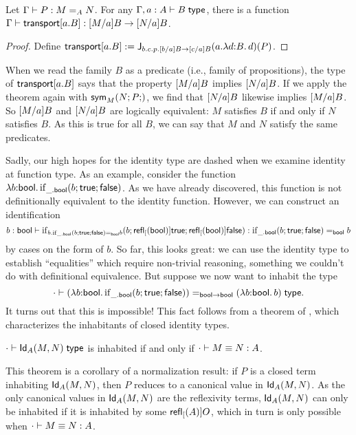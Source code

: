 \documentclass{article}
\newcommand{\Idsym}[4]{\mathsf{sym}_{#1}(#2;#3;#4)}
\begin{document}
\begin{theorem}
  Let $\hasEF{\Gamma}{P}{\Ideq{A}{M}{N}}$. For any $\hasTF{\Gamma,a:A}{B}$,
  there is a function
  $\hasEF{\Gamma}{\transport{a.B}}{\subst{M}{a}{B} \to \subst{N}{a}{B}}$.
\end{theorem}
\begin{proof}
  Define
  $\mathsf{transport}[{a.B}] := \mathsf{J}_{b.c.p.[b/a]B \to [c/a]B}(a.\lambda d {:} B.\, d)(P)$.
\end{proof}

When we read the family $B$ as a predicate (i.e., family of propositions), the
type of $\mathsf{transport}[{a.B}]$ says that the property $[M/a]B$ implies
$[N/a]B$. If we apply the theorem again with $\Idsym{M}{N}{P}$, we find
that $[N/a]B$ likewise implies $[M/a]B$. So $[M/a]B$
and $[N/a]B$ are logically equivalent: $M$ satisfies $B$ if and only if
$N$ satisfies $B$. As this is true for all $B$, we can say that $M$ and $N$
satisfy the same predicates.

Sadly, our high hopes for the identity type are dashed when we examine identity
at function type. As an example, consider the function
$\lambda b {:} \mathsf{bool}.\, \mathrm{if}_{\_.\mathsf{bool}}(b; \mathsf{true}; \mathsf{false})$. As we have already
discovered, this function is not definitionally equivalent to the identity
function. However, we can construct an identification
\[
  \hasEF{b:\bool}{\ifexprtyp{b.\Ideq{\bool}{\ifexprtyp{\_.\bool}{b}{\true}{\false}}{b}}{b}{\refl[\bool]{\true}}{\refl[\bool]{\false}}}{\Ideq{\bool}{\ifexprtyp{\_.\bool}{b}{\true}{\false}}{b}}
\]
by cases on the form of $b$. So far, this looks great: we can use the identity
type to establish ``equalities'' which require non-trivial reasoning, something
we couldn't do with definitional equivalence. But suppose we now want to inhabit
the type
\[
  \hasTF{\cdot}{\Ideq{\bool\to\bool}{(\lam{b}{\bool}{\ifexprtyp{\_.\bool}{b}{\true}{\false}})}{(\lam{b}{\bool}{b})}}.
\]
It turns out that this is impossible! This fact follows from a theorem of
\citet[Theorem 3.14]{MartinLof:73}, which characterizes the inhabitants of
closed identity types.

\begin{theorem}[Martin-L\"of]
  \label{thm:closed-id-is-definitional}
  $\hasTF{\cdot}{\Id{A}{M}{N}}$ is inhabited if and only if
  $\hasEEF{\cdot}{M}{N}{A}$.
\end{theorem}

This theorem is a corollary of a normalization result: if $P$ is a closed term
inhabiting $\mathsf{Id}_{A}(M,N)$, then $P$ reduces to a canonical value in
$\mathsf{Id}_{A}(M,N)$. As the only canonical values in $\mathsf{Id}_{A}(M,N)$ are the
reflexivity terms, $\mathsf{Id}_{A}(M,N)$ can only be inhabited if it is inhabited by
some $\mathsf{refl}_{[}(A)]{O}$, which in turn is only possible when
$\hasEEF{\cdot}{M}{N}{A}$.
\end{document}
